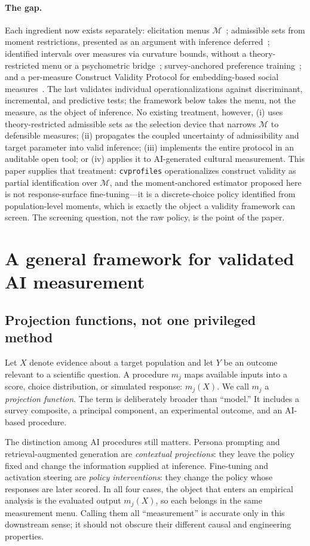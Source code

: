 \documentclass[10pt,letterpaper]{article}
\newcommand{\cvp}{\texttt{cvprofiles}}
\newcommand{\M}{\ensuremath{\mathcal{M}}}
\begin{document}
\paragraph{The gap.}
Each ingredient now exists separately: elicitation menus \M{}~\cite{licht2025}; admissible sets from moment restrictions, presented as an argument with inference deferred~\cite{dellrambachan2026}; identified intervals over measures via curvature bounds, without a theory-restricted menu or a psychometric bridge~\cite{ogutyin2026}; survey-anchored preference training~\cite{plural2026,palms2026}; and a per-measure Construct Validity Protocol for embedding-based social measures~\cite{proxy2026}. The last validates individual operationalizations against discriminant, incremental, and predictive tests; the framework below takes the menu, not the measure, as the object of inference. No existing treatment, however, (i) uses theory-restricted admissible sets as the selection device that narrows \M{} to defensible measures; (ii) propagates the coupled uncertainty of admissibility and target parameter into valid inference; (iii) implements the entire protocol in an auditable open tool; or (iv) applies it to AI-generated cultural measurement. This paper supplies that treatment: \cvp{} operationalizes construct validity as partial identification over \M{}, and the moment-anchored estimator proposed here is not response-surface fine-tuning---it is a discrete-choice policy identified from population-level moments, which is exactly the object a validity framework can screen. The screening question, not the raw policy, is the point of the paper.

\section{A general framework for validated AI measurement}
\subsection{Projection functions, not one privileged method}
Let $X$ denote evidence about a target population and let $Y$ be an outcome relevant to a scientific question. A procedure $m_j$ maps available inputs into a score, choice distribution, or simulated response: $m_j(X)$. We call $m_j$ a \emph{projection function}. The term is deliberately broader than ``model.'' It includes a survey composite, a principal component, an experimental outcome, and an AI-based procedure.

The distinction among AI procedures still matters. Persona prompting and retrieval-augmented generation are \emph{contextual projections}: they leave the policy fixed and change the information supplied at inference. Fine-tuning and activation steering are \emph{policy interventions}: they change the policy whose responses are later scored. In all four cases, the object that enters an empirical analysis is the evaluated output $m_j(X)$, so each belongs in the same measurement menu. Calling them all ``measurement'' is accurate only in this downstream sense; it should not obscure their different causal and engineering properties.
\end{document}
